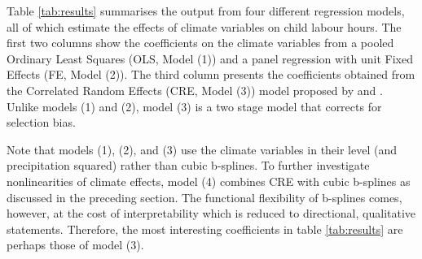 \documentclass[a4paper,12pt]{article}
\theoremstyle{plain}
\theoremstyle{definition}
\theoremstyle{definition}
\theoremstyle{definition}
\theoremstyle{definition}
\begin{document}
Table \ref{tab:results} summarises the output from four different regression models, all of which estimate the effects of climate variables on child labour hours. The first two columns show the coefficients on the climate variables from a pooled Ordinary Least Squares (OLS, Model (1)) and a panel regression with unit Fixed Effects (FE, Model (2)). The third column presents the coefficients obtained from the Correlated Random Effects (CRE, Model (3)) model proposed by \citet{wooldridge1995} and \citet{semykina2010}. Unlike models (1) and (2), model (3) is a two stage model that corrects for selection bias.

Note that models (1), (2), and (3) use the climate variables in their level (and precipitation squared) rather than cubic b-splines. To further investigate nonlinearities of climate effects, model (4) combines CRE with cubic b-splines as discussed in the preceding section. The functional flexibility of b-splines comes, however, at the cost of interpretability which is reduced to directional, qualitative statements. Therefore, the most interesting coefficients in table \ref{tab:results} are perhaps those of model (3).
\end{document}

